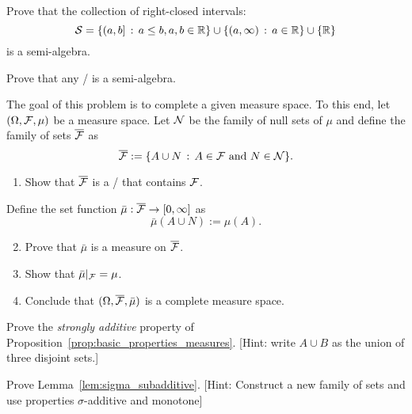 \begin{problem}\label{prb:right_closed_intervals}
Prove that the collection of right-closed intervals:
\[
	\mathcal{S} = \{(a,b] \, : \, a\le b, a, b \in \mathbb R\} \cup \{(a,\infty) \, : \, a \in \mathbb R\} \cup \{\mathbb R\}
\]
is a semi-algebra.
\end{problem}

\begin{problem}\label{prb:sigalg_is_semialg}
Prove that any \sigalg/ is a semi-algebra.
\end{problem}

\begin{problem}\label{prb:completion_measure_space}
The goal of this problem is to complete a given measure space. To this end, let $(\Omega, \mathcal F, \mu)$ be a measure space. Let $\mathcal N$ be the family of null sets of $\mu$ and define the family of sets $\overline{\mathcal F}$ as
\[
	\overline{\mathcal F} := \{A \cup N \, : \, A \in \mathcal F \text{ and } N \in \mathcal N\}.
\]
\begin{enumerate}
\item Show that $\overline{\mathcal F}$ is a \sigalg/ that contains $\mathcal F$.
\end{enumerate}
Define the set function $\bar{\mu} : \overline{\mathcal F} \to [0,\infty]$ as
\[
	\bar{\mu}(A \cup N) := \mu(A).
\]
\begin{enumerate}
\setcounter{enumi}{1}
\item Prove that $\bar{\mu}$ is a measure on $\overline{\mathcal F}$.
\item Show that $\bar{\mu}|_{\mathcal F} = \mu$.
\item Conclude that $(\Omega, \overline{\mathcal F}, \bar{\mu})$ is a complete measure space.
\end{enumerate}
\end{problem}

\begin{problem}\label{prb:strongly_additive}
Prove the \emph{strongly additive} property of Proposition~\ref{prop:basic_properties_measures}. [Hint: write $A \cup B$ as the union of three disjoint sets.]
\end{problem}

\begin{problem}\label{prb:sigma_subadditive}
Prove Lemma~\ref{lem:sigma_subadditive}. [Hint: Construct a new family of sets and use properties $\sigma$-additive and monotone] 
\end{problem}






